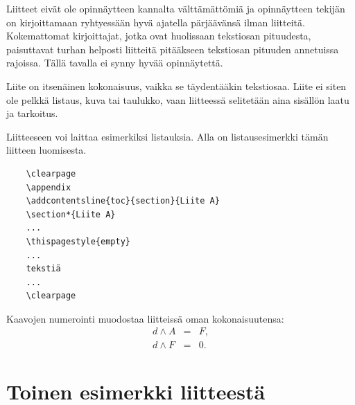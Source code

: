 \documentclass[finnish,12pt,a4paper,pdftex]{article}
\begin{document}
Liitteet eivät ole opinnäytteen kannalta välttämättömiä ja 
opinnäytteen tekijän on 
kirjoittamaan ryhtyessään hyvä ajatella pärjäävänsä ilman liitteitä.
Kokemattomat kirjoittajat, jotka ovat huolissaan
tekstiosan pituudesta, paisuttavat turhan 
helposti liitteitä pitääkseen tekstiosan pituuden annetuissa rajoissa.
Tällä tavalla ei synny hyvää opinnäytettä.   

Liite on itsenäinen kokonaisuus, vaikka se täydentääkin tekstiosaa.
Liite ei siten ole pelkkä listaus, kuva tai taulukko, vaan 
liitteessä selitetään aina sisällön laatu ja tarkoitus. 

Liitteeseen voi laittaa esimerkiksi listauksia. Alla on 
listausesimerkki tämän liitteen luomisesta. 

\begin{verbatim}
	\clearpage
	\appendix
	\addcontentsline{toc}{section}{Liite A}
	\section*{Liite A}
	...
	\thispagestyle{empty}
	...
	tekstiä
	...
	\clearpage
\end{verbatim}

Kaavojen numerointi muodostaa liitteissä oman kokonaisuutensa:
\begin{eqnarray}
d \wedge A  &=& F, \label{liitekaava1}\\
d \wedge F  &=& 0. \label{liitekaava2}
\end{eqnarray}


\clearpage
\section{Toinen esimerkki liitteestä\label{LiiteB}}

\renewcommand{\theequation}{B\arabic{equation}}
\setcounter{equation}{0}  
\renewcommand{\thefigure}{B\arabic{figure}}
\setcounter{figure}{0}
\renewcommand{\thetable}{B\arabic{table}}
\setcounter{table}{0}
\end{document}
